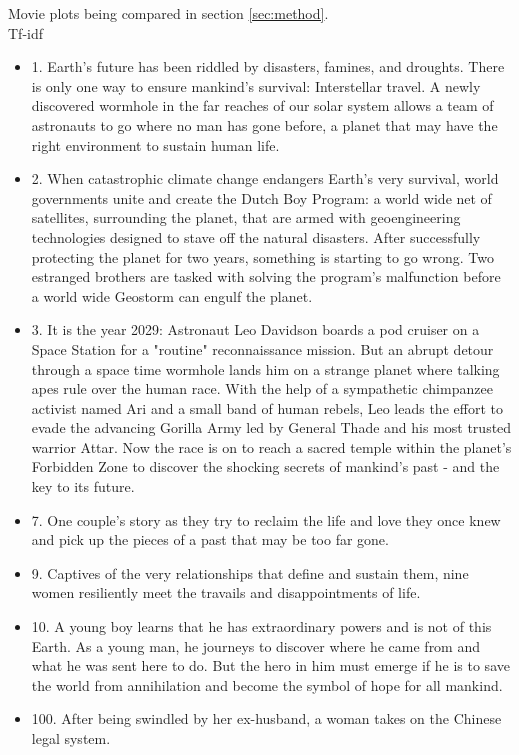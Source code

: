 Movie plots being compared in section \ref{sec:method}.
\\
Tf-idf
\begin{itemize}
    \item 1. Earth's future has been riddled by disasters, famines, and droughts. There is only one way to ensure mankind's survival: Interstellar travel. A newly discovered wormhole in the far reaches of our solar system allows a team of astronauts to go where no man has gone before, a planet that may have the right environment to sustain human life.
    \item 2. When catastrophic climate change endangers Earth's very survival, world governments unite and create the Dutch Boy Program: a world wide net of satellites, surrounding the planet, that are armed with geoengineering technologies designed to stave off the natural disasters. After successfully protecting the planet for two years, something is starting to go wrong. Two estranged brothers are tasked with solving the program's malfunction before a world wide Geostorm can engulf the planet.
    \item 3. It is the year 2029: Astronaut Leo Davidson boards a pod cruiser on a Space Station for a "routine" reconnaissance mission. But an abrupt detour through a space time wormhole lands him on a strange planet where talking apes rule over the human race. With the help of a sympathetic chimpanzee activist named Ari and a small band of human rebels, Leo leads the effort to evade the advancing Gorilla Army led by General Thade and his most trusted warrior Attar. Now the race is on to reach a sacred temple within the planet's Forbidden Zone to discover the shocking secrets of mankind's past - and the key to its future. 
    \item 7. One couple's story as they try to reclaim the life and love they once knew and pick up the pieces of a past that may be too far gone.
    \item 9. Captives of the very relationships that define and sustain them, nine women resiliently meet the travails and disappointments of life.
    \item 10. A young boy learns that he has extraordinary powers and is not of this Earth. As a young man, he journeys to discover where he came from and what he was sent here to do. But the hero in him must emerge if he is to save the world from annihilation and become the symbol of hope for all mankind.
    \item 100. After being swindled by her ex-husband, a woman takes on the Chinese legal system.
\end{itemize}

